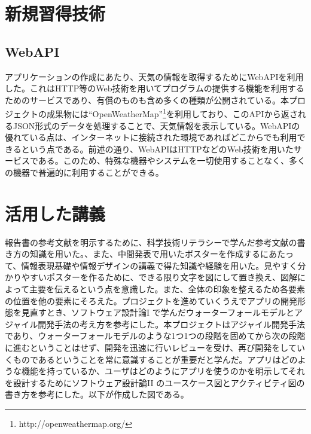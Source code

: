 \documentclass[openany,11pt,papersize]{jsbook}
\begin{document}
\begin{appendix}
\chapter{新規習得技術}
\section{WebAPI}
アプリケーションの作成にあたり、天気の情報を取得するためにWebAPIを利用した。これはHTTP等のWeb技術を用いてプログラムの提供する機能を利用するためのサービスであり、有償のものも含め多くの種類が公開されている。本プロジェクトの成果物には``OpenWeatherMap''\footnote{http://openweathermap.org/}を利用しており、このAPIから返されるJSON形式のデータを処理することで、天気情報を表示している。WebAPIの優れている点は、インターネットに接続された環境であればどこからでも利用できるという点である。前述の通り、WebAPIはHTTPなどのWeb技術を用いたサービスである。このため、特殊な機器やシステムを一切使用することなく、多くの機器で普遍的に利用することができる。

\chapter{活用した講義}
 報告書の参考文献を明示するために、科学技術リテラシーで学んだ参考文献の書き方の知識を用いた。、また、中間発表で用いたポスターを作成するにあたって、情報表現基礎や情報デザインの講義で得た知識や経験を用いた。見やすく分かりやすいポスターを作るために、できる限り文字を図にして置き換え、図解によって主要を伝えるという点を意識した。また、全体の印象を整えるため各要素の位置を他の要素にそろえた。プロジェクトを進めていくうえでアプリの開発形態を見直すとき、ソフトウェア設計論I  で学んだウォーターフォールモデルとアジャイル開発手法の考え方を参考にした。本プロジェクトはアジャイル開発手法であり、ウォーターフォールモデルのような1つ1つの段階を固めてから次の段階に進むということはせず、開発を迅速に行いレビューを受け、再び開発をしていくものであるということを常に意識することが重要だと学んだ。アプリはどのような機能を持っているか、ユーザはどのようにアプリを使うのかを明示してそれを設計するためにソフトウェア設計論II  のユースケース図とアクティビティ図の書き方を参考にした。以下が作成した図である。



\end{appendix}
\end{document}
